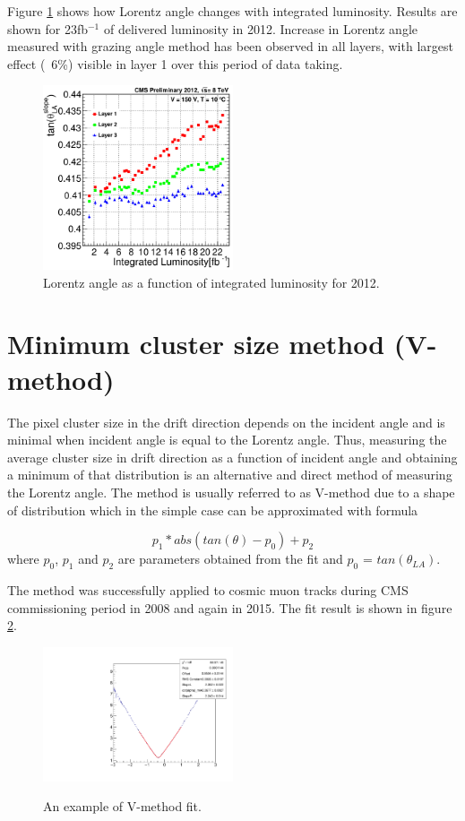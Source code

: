 Figure \ref{fig:La2012} shows how Lorentz angle changes with integrated luminosity. Results are shown for 23fb$^{-1}$ of delivered luminosity in 2012. Increase in Lorentz angle measured with grazing angle method has been observed in all layers, with largest effect (~6\%) visible in layer 1 over this period of data taking.  
\begin{figure}[ht!]
\centering
\includegraphics[width=0.5\textwidth]{Figures/LA2012.png}
\caption{Lorentz angle as a function of integrated luminosity for 2012.}
\label{fig:La2012}
\end{figure}

\section{Minimum cluster size method (V-method)}
The pixel cluster size in the drift direction depends on the incident
angle and is minimal when incident angle is equal to the Lorentz angle. Thus, measuring the average cluster size in drift direction as a function of incident angle and obtaining a minimum of that
distribution is an alternative and direct method of measuring the Lorentz angle. The method is usually referred to as V-method due
to a shape of distribution which in the simple case can be approximated with formula

\begin{equation}
p_1*abs(tan(\theta) - p_0) + p_2
\end{equation}
where $p_0$, $p_1$ and $p_2$ are parameters obtained from the fit and $p_0$ = $tan(\theta_{LA})$.

The method was successfully applied to cosmic muon tracks during CMS commissioning period in 2008 and again in 2015. The fit result is shown in figure \ref{fig:LA_VMethod}.

\begin{figure}[hbtp!]
	\centering
	\includegraphics[width=0.5\textwidth]{Figures/LA_VMethod_2015.pdf}
	\label{fig:LA_VMethod}
	\caption{An example of V-method fit.}
\end{figure}

